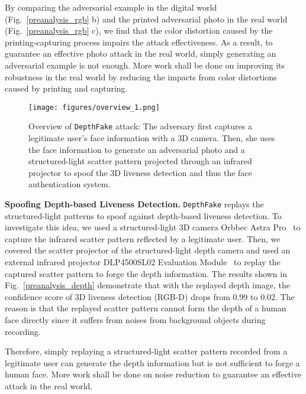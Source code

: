 By comparing the adversarial example in the digital world (Fig.~\ref{preanalysis_rgb} b) and the printed adversarial photo in the real world (Fig.~\ref{preanalysis_rgb} c), we find that the color distortion caused by the printing-capturing process impairs the attack effectiveness. As a result, to guarantee an effective photo attack in the real world, simply generating an adversarial example is not enough. More work shall be done on improving its robustness in the real world by reducing the impacts from color distortions caused by printing and capturing.


\begin{figure*}[pt]
	\centerline{\texttt{[image: figures/overview\_1.png]}}
	\vspace{-0.15in}
	\caption{Overview of \texttt{DepthFake} attack: The adversary first captures a legitimate user's face information with a 3D camera. Then, she uses the face information to generate an adversarial photo and a structured-light scatter pattern projected through an infrared projector to spoof the 3D liveness detection and thus the face authentication system. }
	\label{overview}
		\vspace{-0.15in}
\end{figure*}

\textbf{Spoofing Depth-based Liveness Detection.} \texttt{DepthFake} replays the structured-light patterns to spoof against depth-based liveness detection.
To investigate this idea, we used a structured-light 3D camera Orbbec Astra Pro~\cite{da2020comparison} to capture the infrared scatter pattern reflected by a legitimate user. 
Then, we covered the scatter projector of the structured-light depth camera and used an external infrared projector DLP4500SL02 Evaluation Module~\cite{chong2017intraoperative} to replay the captured scatter pattern to forge the depth information.
The results shown in Fig.~\ref{preanalysis_depth} demonstrate that with the replayed depth image, the confidence score of 3D liveness detection (RGB-D) drops from 0.99 to 0.02.  The reason is that the replayed scatter pattern cannot form the depth of a human face directly since it suffers from noises from background objects during recording. 

Therefore, simply replaying a structured-light scatter pattern recorded from a  legitimate user can generate the depth information but is not sufficient to forge a human face. More work shall be done on noise reduction to guarantee an effective attack in the real world.

